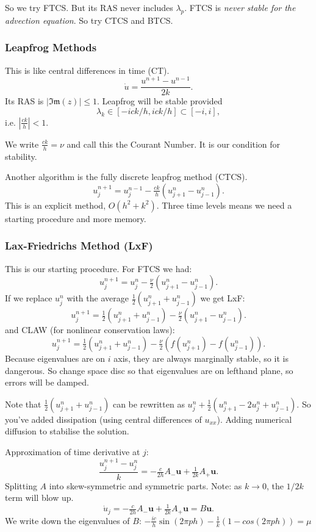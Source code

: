 \documentclass[12pt, a4paper]{article}
\renewcommand{\vec}[1]{\mathbf{#1}}
\theoremstyle{definition}
\theoremstyle{remark}
\numberwithin{equation}{section}
\begin{document}
So we try FTCS. But its RAS never includes $\lambda_p$. FTCS is \emph{never
stable for the advection equation}. So try CTCS and BTCS.

\newpage
\subsubsection{Leapfrog Methods}

This is like central differences in time (CT).
$$ \dot{u} = \frac{u^{n+1} - u^{n-1}}{2k}. $$
Its RAS is $|\mathfrak{Im}(z)| \le 1$. 
Leapfrog will be stable provided $$\lambda_k \in [-ick/h, ick/h] \subset [-i, i],$$
i.e. $\left| \frac{ck}{h} \right| < 1$.

We write $\frac{ck}{h}=\nu$ and call this the Courant Number. It is our condition for
stability.

Another algorithm is the fully discrete leapfrog method (CTCS).
$$ u_j^{n+1} = u_j^{n-1} - \tfrac{ck}{h}(u_{j+1}^n - u_{j-1}^n). $$
This is an explicit method, $O(h^2 + k^2)$. Three time levels means we need a
starting procedure and more memory.

\newpage
\subsubsection{Lax-Friedrichs Method (LxF)}

This is our starting procedure. For FTCS we had:
$$ u_j^{n+1} = u_j^n - \tfrac{\nu}{2}(u_{j+1}^n - u_{j-1}^n). $$
If we replace $u_j^n$ with the average $\frac{1}{2}(u_{j+1}^n + u_{j-1}^n)$
we get LxF:
$$ u_j^{n+1} = \tfrac{1}{2}(u_{j+1}^n + u_{j-1}^n) - \tfrac{\nu}{2}(u_{j+1}^n - u_{j-1}^n). $$
and CLAW (for nonlinear conservation laws):
$$ u_j^{n+1} = \tfrac{1}{2}(u_{j+1}^n + u_{j-1}^n) - \tfrac{\nu}{2}(f(u_{j+1}^n) - f(u_{j-1}^n)). $$
Because eigenvalues are on $i$ axis, they are always marginally stable, so it is dangerous.
So change space disc so that eigenvalues are on lefthand plane, so errors will be damped.

Note that $\frac{1}{2}(u_{j+1}^n + u_{j-1}^n)$ can be rewritten as \mbox{$u_j^n + \frac{1}{2}(u_{j+1}^n - 2u_j^n + u_{j-1}^n)$}. 
So you've added dissipation (using central differences of $u_{xx}$). 
Adding numerical diffusion to stabilise the solution.

Approximation of time derivative at $j$:
$$ \frac{u_j^{n+1} - u_j^n}{k} = -\tfrac{c}{2h}A_{-}\mathbf{u} + \tfrac{1}{2k}A_{+}\mathbf{u}. $$
Splitting $A$ into skew-symmetric and symmetric parts.  Note: as $k \rightarrow 0$, the $1/2k$ term
will blow up.
$$ \dot{u}_j = -\tfrac{c}{2h} A_{-}\mathbf{u} + \tfrac{1}{2k}A_{+}\vec{u} = B\mathbf{u}. $$
We write down the eigenvalues of $B$: $-\frac{ic}{h}\sin(2\pi ph)-\frac{1}{k}(1-cos(2\pi ph)) = \mu$
\end{document}

